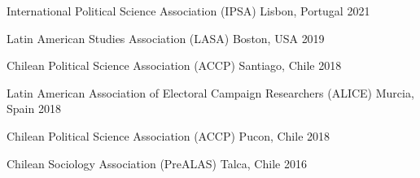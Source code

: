 





\vspace{1mm}

\begin{cvhonors}
\cvconf
{International Political Science Association (IPSA)} 
{Lisbon, Portugal}
{2021}
\end{cvhonors}

\begin{cvhonors}
\cvconf
{Latin American Studies Association (LASA)} 
{Boston, USA}
{2019}
\end{cvhonors}

\begin{cvhonors}
\cvconf
{Chilean Political Science Association (ACCP)} 
{Santiago, Chile}
{2018}
\end{cvhonors}

\begin{cvhonors}
\cvconf
{Latin American Association of Electoral Campaign Researchers (ALICE)} 
{Murcia, Spain}
{2018}
\end{cvhonors}

\begin{cvhonors}
\cvconf
{Chilean Political Science Association (ACCP)} 
{Pucon, Chile}
{2018}
\end{cvhonors}


\begin{cvhonors}
\cvconf
{Chilean Sociology Association (PreALAS)} 
{Talca, Chile}
{2016}
\end{cvhonors}

